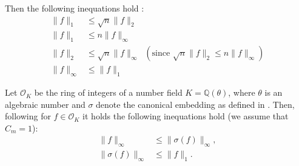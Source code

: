 Then the following inequations hold \cite{BDLOP18}:
\begin{align}
    \| f \|_1      & \leq \sqrt{n} \| f \|_2 \label{norm1}                                                                    \\
    \| f \|_1      & \leq n \| f \|_\infty \label{norm2}                                                                      \\
    \| f \|_2      & \leq \sqrt{n} \| f \|_\infty \;\;(\text{since }  \sqrt{n} \| f \|_2 \leq n \| f \|_\infty) \label{norm3} \\
    \| f \|_\infty & \leq \| f \|_1 \label{norm4}
\end{align}

Let $\mathcal{O}_K$ be the ring of integers of a number field $K=\mathbb{Q}(\theta)$, where $\theta$ is an algebraic number and $\sigma$ denote the canonical embedding as defined in \cite{DPSZ12}. Then, following \cite{DPSZ12} for $f \in \mathcal{O}_K$ it holds the following inequations hold (we assume that $C_m = 1$): %
\begin{align}
    \| f \|_\infty         & \leq \| \sigma(f) \|_\infty \label{norm5}, \\
    \| \sigma(f) \|_\infty & \leq \| f \|_1 \label{norm6}.
\end{align}


